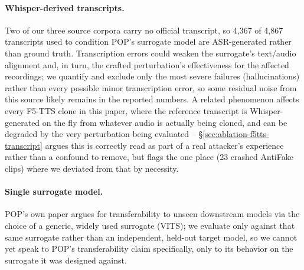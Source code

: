 \documentclass[11pt]{article}
\begin{document}
\paragraph{Whisper-derived transcripts.} Two of our three source
corpora carry no official transcript, so 4,367 of 4,867 transcripts
used to condition POP's surrogate model are ASR-generated rather than
ground truth. Transcription errors could weaken the surrogate's
text/audio alignment and, in turn, the crafted perturbation's
effectiveness for the affected recordings; we quantify and exclude
only the most severe failures (hallucinations) rather than every
possible minor transcription error, so some residual noise from this
source likely remains in the reported numbers. A related phenomenon
affects every F5-TTS clone in this paper, where the reference
transcript is Whisper-generated on the fly from whatever audio is
actually being cloned, and can be degraded by the very perturbation
being evaluated -- \S\ref{sec:ablation-f5tts-transcript} argues this
is correctly read as part of a real attacker's experience rather than
a confound to remove, but flags the one place (23 crashed AntiFake
clips) where we deviated from that by necessity.

\paragraph{Single surrogate model.} POP's own paper argues for
transferability to unseen downstream models via the choice of a
generic, widely used surrogate (VITS); we evaluate only against that
same surrogate rather than an independent, held-out target model, so
we cannot yet speak to POP's transferability claim specifically,
only to its behavior on the surrogate it was designed against.
\end{document}
